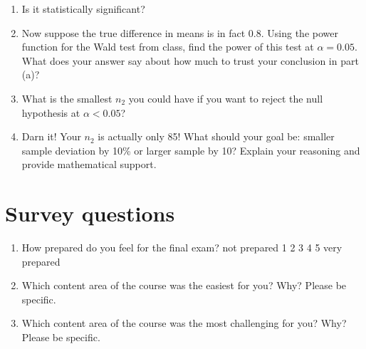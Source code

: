\documentclass[11pt]{article}
\begin{document}
\begin{enumerate}[label=\alph*.]
\item Is it statistically significant?
\item Now suppose the true difference in means is in fact 0.8. Using
  the power function for the Wald test from class, find the power of
  this test at \(\alpha = 0.05\). What does your answer say about how
  much to trust your conclusion in part (a)?
\item What is the smallest \(n_2\) you could have if you want to
  reject the null hypothesis at \(\alpha < 0.05\)?
\item Darn it! Your \(n_2\) is actually only 85! What should your goal
  be: smaller sample deviation by 10\% or larger sample by 10? Explain
  your reasoning and provide mathematical support.
\end{enumerate}



\section*{Survey questions}

\begin{enumerate}[label=\arabic*.]
\item How prepared do you feel for the final exam? not prepared 1 2 3
  4 5 very prepared
\item Which content area of the course was the easiest for you? Why?
  Please be specific.
\item Which content area of the course was the most challenging for
  you? Why? Please be specific.
\end{enumerate}
\end{document}
